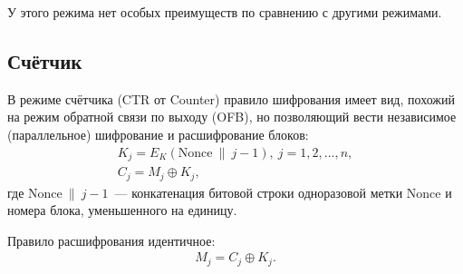 У этого режима нет особых преимуществ по сравнению с другими режимами.


\subsection{Счётчик}

В режиме счётчика (CTR от Counter) правило шифрования имеет вид, похожий на режим обратной связи по выходу (OFB), но позволяющий вести независимое (параллельное) шифрование и расшифрование блоков:
\[ \begin{array}{l}
    K_j = E_K(\textrm{Nonce} ~\|~ j - 1), ~ j = 1, 2, \dots, n, \\
    C_j = M_j \oplus K_j,
\end{array} \]
где $\textrm{Nonce} ~\|~ j - 1$~--- конкатенация битовой строки одноразовой метки $\textrm{Nonce}$ и номера блока, уменьшенного на единицу.

Правило расшифрования идентичное:
\[ \begin{array}{l}
    M_j = C_j \oplus K_j. \\
\end{array} \]
